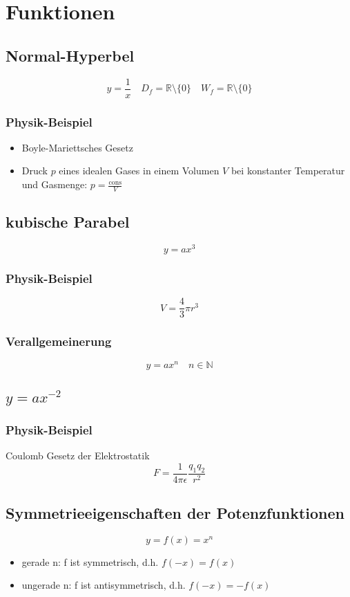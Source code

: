 \documentclass[11pt]{article}
\begin{document}
\section{Funktionen}
\label{sec-5}
\subsection{Normal-Hyperbel}
\label{sec-5-1}
\[y=\frac{1}{x}\quad D_f=\mathbb{R}\setminus\{0\}\quad W_f=\mathbb{R}\setminus\{0\}\]
\subsubsection{Physik-Beispiel}
\label{sec-5-1-1}
\begin{itemize}
\item Boyle-Mariettsches Gesetz
\item Druck $p$ eines idealen Gases in einem Volumen $V$ bei konstanter Temperatur und Gasmenge: $p = \frac{\text{cons}}{V}$
\end{itemize}
\subsection{kubische Parabel}
\label{sec-5-2}
\[y=a x^3\]
\subsubsection{Physik-Beispiel}
\label{sec-5-2-1}
\[V=\frac{4}{3}\pi r^3\]
\subsubsection{Verallgemeinerung}
\label{sec-5-2-2}
\[y=a x^n\quad n\in\mathbb{N}\]
\subsection{$y=a x^{-2}$}
\label{sec-5-3}
\subsubsection{Physik-Beispiel}
\label{sec-5-3-1}
Coulomb Gesetz der Elektrostatik \[F=\frac{1}{4\pi\epsilon}\frac{q_1 q_2}{r^2}\]
\subsection{Symmetrieeigenschaften der Potenzfunktionen}
\label{sec-5-4}
\[y=f(x)=x^n\]
\begin{itemize}
\item gerade n: f ist symmetrisch, d.h. $f(-x) = f(x)$
\item ungerade n: f ist antisymmetrisch, d.h. $f(-x) = -f(x)$
\end{itemize}
\end{document}

